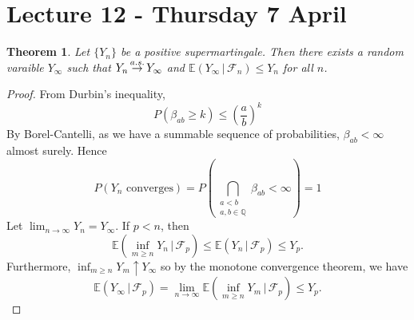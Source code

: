 \documentclass[10pt, oneside, reqno]{amsart}
\theoremstyle{plain}%
\newtheorem{thm}{Theorem}[section]
\theoremstyle{definition}
\theoremstyle{remark}
\newcommand{\given}{ \, | \,}
\newcommand{\sigf}{\mathcal{F}}
\newcommand{\Q}{\mathbb{Q}}
\newcommand{\E}{\mathbb{E}}
\def\cas{\,{\buildrel a.s. \over \rightarrow}\,}
\begin{document}

\section{Lecture 12 - Thursday 7 April} %
\label{sec:lecture_12_thursday_7_april}
\begin{thm}
	Let $\{ Y_n \}$ be a positive supermartingale.  Then there exists a random varaible $Y_\infty$ such that $Y_n \cas Y_\infty$ and $\E(Y_\infty \given \sigf_n) \leq Y_n$ for all $n$.
\end{thm}
\begin{proof}
	From Durbin's inequality, \[
		P(\beta_{ab} \geq k) \leq \left( \frac{a}{b} \right)^k
	\]  By Borel-Cantelli, as we have a summable sequence of probabilities, $\beta_{ab}  < \infty$ almost surely.  Hence \[
		P(\text{$Y_n$ converges}) = P\left(\bigcap_{\substack{a < b \\ a, b \in \Q}} \beta_{ab} < \infty \right) = 1
	\] Let $\lim_{n \rightarrow \infty}Y_n = Y_\infty$. If $p < n$, then \[
		\E\left( \inf_{m \geq n} Y_n \given \sigf_p \right) \leq \E(Y_n \given \sigf_p) \leq Y_p.	\]  Furthermore, $\inf_{m \geq n} Y_m \uparrow Y_\infty$ so by the monotone convergence theorem, we have \[
			\E(Y_\infty \given \sigf_p) = \lim_{n \rightarrow \infty} \E\left( \inf_{m \geq n} Y_m \given \sigf_p \right) \leq Y_p.
		\]  
\end{proof}
\end{document}
